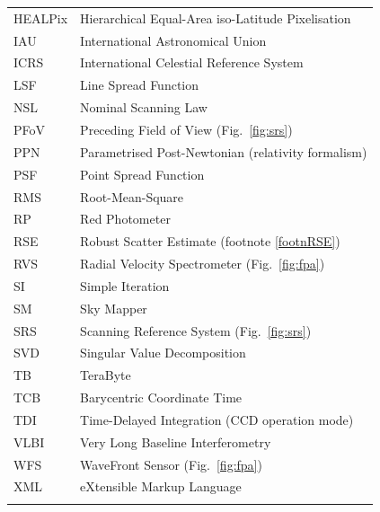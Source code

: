 \documentclass[structabstract]{aa}
\begin{document}
\begin{table}
\begin{tabular}{ll}
HEALPix&Hierarchical Equal-Area iso-Latitude Pixelisation \\
IAU&International Astronomical Union \\
ICRS&International Celestial Reference System \\
LSF&Line Spread Function \\
NSL&Nominal Scanning Law \\
PFoV&Preceding Field of View (Fig.~\ref{fig:srs}) \\
PPN&Parametrised Post-Newtonian (relativity formalism) \\
PSF&Point Spread Function \\
RMS&Root-Mean-Square \\
RP&Red Photometer \\
RSE&Robust Scatter Estimate (footnote \ref{footnRSE}) \\
RVS&Radial Velocity Spectrometer (Fig.~\ref{fig:fpa}) \\
SI&Simple Iteration \\
SM&Sky Mapper \\
SRS&Scanning Reference System (Fig.~\ref{fig:srs}) \\
SVD&Singular Value Decomposition \\
TB&TeraByte \\
TCB&Barycentric Coordinate Time \\
TDI&Time-Delayed Integration (CCD operation mode)\\
VLBI&Very Long Baseline Interferometry \\
WFS&WaveFront Sensor (Fig.~\ref{fig:fpa}) \\
XML&eXtensible Markup Language \\
\noalign{\smallskip} 
\hline 
\end{tabular} 
\end{table}
\end{document}
